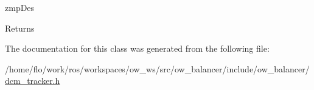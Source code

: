 zmp\+Des 

\begin{DoxyReturn}{Returns}

\end{DoxyReturn}


The documentation for this class was generated from the following file\+:\begin{DoxyCompactItemize}
\item 
/home/flo/work/ros/workspaces/ow\+\_\+ws/src/ow\+\_\+balancer/include/ow\+\_\+balancer/\hyperlink{dcm__tracker_8h}{dcm\+\_\+tracker.\+h}\end{DoxyCompactItemize}
